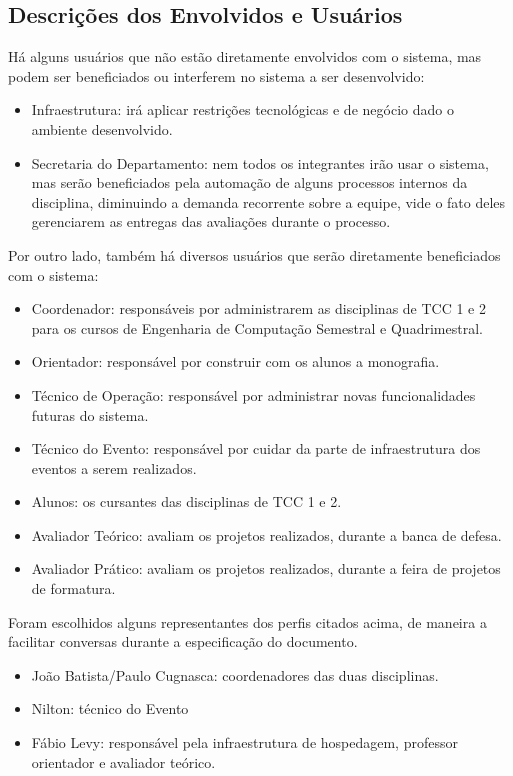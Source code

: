 \subsection{Descrições dos Envolvidos e Usuários}
Há alguns usuários que não estão diretamente envolvidos com o sistema, mas podem ser beneficiados ou interferem no sistema a ser desenvolvido:

\begin{itemize}
    \item Infraestrutura: irá aplicar restrições tecnológicas e de negócio dado o ambiente desenvolvido.
    \item Secretaria do Departamento: nem todos os integrantes irão usar o sistema, mas serão beneficiados pela automação de alguns processos internos da disciplina, diminuindo a demanda recorrente sobre a equipe, vide o fato deles gerenciarem as entregas das avaliações durante o processo.
\end{itemize}

Por outro lado, também há diversos usuários que serão diretamente beneficiados com o sistema:

\begin{itemize}
    \item Coordenador: responsáveis por administrarem as disciplinas de TCC 1 e 2 para os cursos de Engenharia de Computação Semestral e Quadrimestral.
    \item Orientador: responsável por construir com os alunos a monografia.
    \item Técnico de Operação: responsável por administrar novas funcionalidades futuras do sistema.
    \item Técnico do Evento: responsável por cuidar da parte de infraestrutura dos eventos a serem realizados.
    \item Alunos: os cursantes das disciplinas de TCC 1 e 2.
    \item Avaliador Teórico: avaliam os projetos realizados, durante a banca de defesa.
    \item Avaliador Prático: avaliam os projetos realizados, durante a feira de projetos de formatura.
\end{itemize}

Foram escolhidos alguns representantes dos perfis citados acima, de maneira a facilitar conversas durante a especificação do documento.

\begin{itemize}
    \item João Batista/Paulo Cugnasca: coordenadores das duas disciplinas.
    \item Nilton: técnico do Evento
    \item Fábio Levy: responsável pela infraestrutura de hospedagem, professor orientador e avaliador teórico.
\end{itemize}

